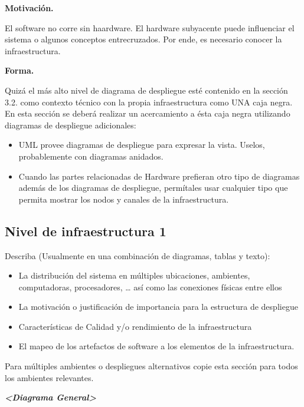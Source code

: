 \documentclass[]{article}
\begin{document}
\textbf{Motivación.}

El software no corre sin haardware. El hardware subyacente puede
influenciar el sistema o algunos conceptos entrecruzados. Por ende, es
necesario conocer la infraestructura.

\textbf{Forma.}

Quizá el más alto nivel de diagrama de despliegue esté contenido en la
sección 3.2. como contexto técnico con la propia infraestructura como
UNA caja negra. En esta sección se deberá realizar un acercamiento a
ésta caja negra utilizando diagramas de despliegue adicionales:

\begin{itemize}
\item
  UML provee diagramas de despliegue para expresar la vista. Uselos,
  probablemente con diagramas anidados.
\item
  Cuando las partes relacionadas de Hardware prefieran otro tipo de
  diagramas además de los diagramas de despliegue, permítales usar
  cualquier tipo que permita mostrar los nodos y canales de la
  infraestructura.
\end{itemize}

\hypertarget{_nivel_de_infraestructura_1}{%
\subsection{Nivel de infraestructura
1}\label{_nivel_de_infraestructura_1}}

Describa (Usualmente en una combinación de diagramas, tablas y texto):

\begin{itemize}
\item
  La distribución del sistema en múltiples ubicaciones, ambientes,
  computadoras, procesadores, \ldots{} así como las conexiones físicas
  entre ellos
\item
  La motivación o justificación de importancia para la estructura de
  despliegue
\item
  Características de Calidad y/o rendimiento de la infraestructura
\item
  El mapeo de los artefactos de software a los elementos de la
  infraestructura.
\end{itemize}

Para múltiples ambientes o despliegues alternativos copie esta sección
para todos los ambientes relevantes.

\emph{\textbf{\textless{}Diagrama General\textgreater{}}}
\end{document}
